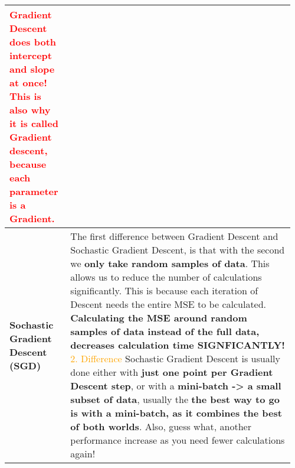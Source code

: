 \documentclass[main.tex,fontsize=8pt,paper=a4,paper=portrait,DIV=calc,]{scrartcl}
\begin{document}
\begin{table}[ht!]
\begin{tabular}{|m{0.2\linewidth}|m{0.755\linewidth}|}
\textcolor{red}{Gradient Descent does \textbf{both intercept and slope at once!} This is also why it is called Gradient descent, because each parameter is a Gradient.}\\
\hline
\textbf{Sochastic Gradient Descent (SGD)} &
The first difference between Gradient Descent and Sochastic Gradient Descent, is that with the second we \textbf{only take random samples of data}.\newline
This allows us to reduce the number of calculations significantly. This is because each iteration of Descent needs the entire MSE to be calculated.\newline
\textbf{Calculating the MSE around random samples of data instead of the full data, decreases calculation time SIGNFICANTLY!}\newline
\textcolor{orange}{2. Difference}\newline
Sochastic Gradient Descent is usually done either with \textbf{just one point per Gradient Descent step}, or with a \textbf{mini-batch -> a small subset of data}, \newline
usually the \textbf{the best way to go is with a mini-batch, as it combines the best of both worlds}.\newline
Also, guess what, another performance increase as you need fewer calculations again!\\
\hline
\end{tabular}
\end{table}
\end{document}
